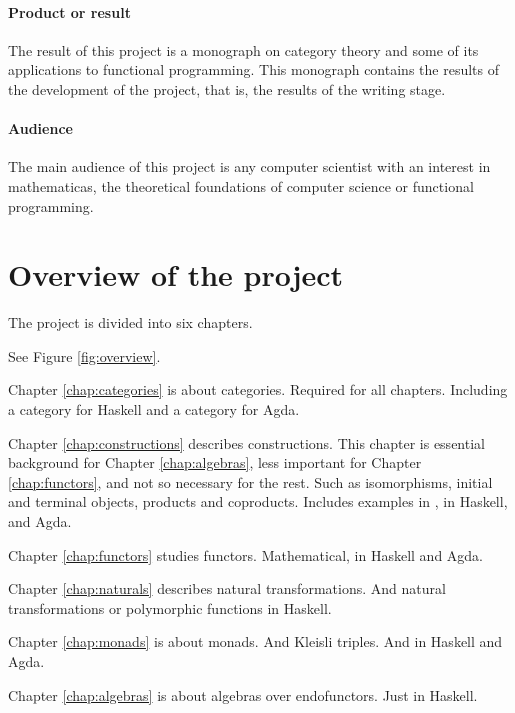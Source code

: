 \paragraph{Product or result}

The result of this project is a monograph on category theory and some
of its applications to functional programming. This monograph contains
the results of the development of the project, that is, the results of
the writing stage.

\paragraph{Audience}

The main audience of this project is any computer scientist with an
interest in mathematicas, the theoretical foundations of computer
science or functional programming.

\section*{Overview of the project}

The project is divided into six chapters.

 See Figure \ref{fig:overview}.

Chapter \ref{chap:categories} is about categories. Required for all
chapters. Including a category for Haskell and a category for Agda.

Chapter \ref{chap:constructions} describes constructions. This chapter
is essential background for Chapter \ref{chap:algebras}, less
important for Chapter \ref{chap:functors}, and not so necessary for
the rest. Such as isomorphisms, initial and terminal objects, products
and coproducts. Includes examples in \set, in Haskell, and Agda.

Chapter \ref{chap:functors} studies functors. Mathematical, in Haskell
and Agda.

Chapter \ref{chap:naturals} describes natural transformations. And
natural transformations or polymorphic functions in Haskell.

Chapter \ref{chap:monads} is about monads. And Kleisli triples. And in
Haskell and Agda.

Chapter \ref{chap:algebras} is about algebras over endofunctors. Just
in Haskell.

